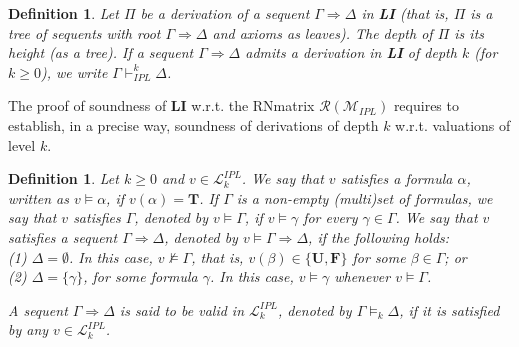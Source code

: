 \documentclass[12pt]{article}
\newtheorem{definition}[theorem]{Definition}
\newcommand{\bT}{\mathbf{T}}
\newcommand{\bU}{\mathbf{U}}
\newcommand{\bF}{\mathbf{F}}
\begin{document}
\begin{definition} Let $\Pi$ be a derivation of a sequent $\Gamma \Rightarrow\Delta$ in {\bf LI} (that is, $\Pi$ is a tree  of sequents with root $\Gamma \Rightarrow\Delta$ and axioms as leaves). The {\em depth} of $\Pi$ is its height (as a tree). If  a sequent $\Gamma \Rightarrow\Delta$ admits a derivation in {\bf LI} of depth $k$ (for $k \geq 0$), we write $\Gamma \vdash_{IPL}^k \Delta$.
\end{definition}

The proof of soundness of  {\bf LI} w.r.t. the RNmatrix $\mathcal{R}(\mathcal{M}_{IPL})$ requires to establish, in a  precise way, soundness of  derivations of depth $k$ w.r.t. valuations of level $k$.



\begin{definition} Let $k \geq 0$ and $v \in \mathcal{L}_k^{IPL}$. We say that $v$ {\em satisfies a formula} $\alpha$, written as $v \models\alpha$, if $v(\alpha)=\bT$. If $\Gamma$ is a non-empty (multi)set of formulas, we say that $v$ {\em satisfies} $\Gamma$, denoted by $v\models\Gamma$, if $v\models \gamma$ for every $\gamma \in \Gamma$. We say that $v$ satisfies a sequent $\Gamma\Rightarrow\Delta$, denoted by $v\models \Gamma\Rightarrow\Delta$, if the following holds:\\[1mm]
(1) $\Delta=\emptyset$. In this case, $v \not\models\Gamma$, that is, $v(\beta)\in\{\bU,\bF\}$ for some $\beta \in \Gamma$; or\\[1mm]
(2) $\Delta=\{\gamma\}$, for some formula $\gamma$. In this case, $v \models\gamma$ whenever $v\models\Gamma$.

A sequent $\Gamma\Rightarrow\Delta$ is said to be {\em valid} in $\mathcal{L}_k^{IPL}$, denoted by $\Gamma\models_k\Delta$, if it is satisfied by any $v \in\mathcal{L}_k^{IPL}$. 
\end{definition}
\end{document}
